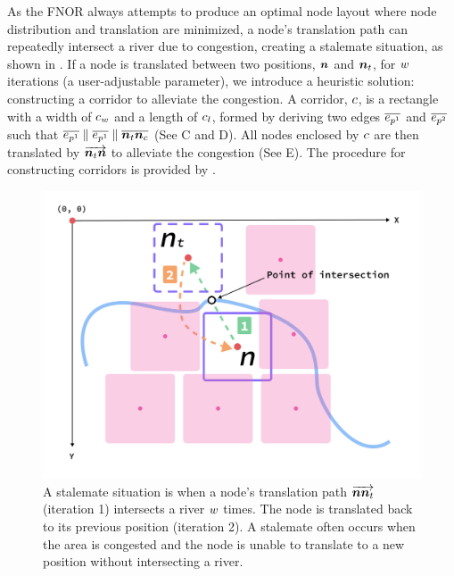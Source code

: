 As the FNOR always attempts to produce an optimal node layout where node distribution and translation are minimized, a node's translation path can repeatedly intersect a river due to congestion, creating a stalemate situation, as shown in . If a node is translated between two positions, $ \bm{n} $ and $ \bm{n}_t $, for $ w $ iterations (a user-adjustable parameter), we introduce a heuristic solution: constructing a corridor to alleviate the congestion. A corridor, $ c $, is a rectangle with a width of $ c_w $ and a length of $ c_l $, formed by deriving two edges $ \protect\overline{e_{p^1}} $ and $ \protect\overline{e_{p^2}} $ such that $ \protect\overline{e_{p^1}} \parallel \protect\overline{e_{p^1}} \parallel \protect\overline{\bm{n}_t\bm{n}_c} $ (See C and D). All nodes enclosed by $ c $ are then translated by $ \protect\overrightarrow{\bm{n}_t\bm{n}} $ to alleviate the congestion (See E). The procedure for constructing corridors is provided by .

    {
        \begin{figure}[tb!]
            \centering
            \includegraphics[width=\columnwidth,keepaspectratio]{figure/stalemate.png}
            \caption{A stalemate situation is when a node's translation path $ \protect\overrightarrow{\bm{n}\bm{n}_t} $ (iteration 1) intersects a river $ w $ times. The node is translated back to its previous position (iteration 2). A stalemate often occurs when the area is congested and the node is unable to translate to a new position without intersecting a river.}
            \label{fig:stalemate}
        \end{figure}
    }

